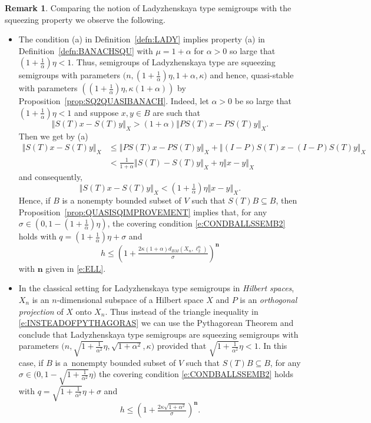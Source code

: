 \documentclass[a4paper,12pt,reqno]{amsart}
\theoremstyle{plain}
\theoremstyle{definition}
\newtheorem{rem}[lem]{Remark}
\numberwithin{equation}{section}
\newcommand{\norm}[1]{\left\Vert#1\right\Vert}
\renewcommand{\leq}{\leqslant}
\begin{document}
\begin{rem}
Comparing the notion of Ladyzhenskaya type semigroups with the squeezing property we observe the following. 
\begin{itemize}
\item[(i)] 
The condition (a) in Definition~\ref{defn:LADY} implies property (a) in Definition~\ref{defn:BANACHSQU} with $\mu=1+\alpha$ for $\alpha>0$ so large that $(1+\frac{1}{\alpha})\eta<1$. Thus, semigroups of Ladyzhenskaya type are squeezing semigroups with parameters $\Big(n, (1+\frac{1}{\alpha})\eta, 1+\alpha, \kappa\Big)$
and hence, quasi-stable with parameters $((1+\frac{1}{\alpha})\eta,\kappa(1+\alpha))$ by Proposition~\ref{prop:SQ2QUASIBANACH}. Indeed, let $\alpha>0$ be so large that $(1+\frac{1}{\alpha})\eta<1$ and suppose $x,y\in B$ are such that
$$\norm{S(T)x-S(T)y}_{X}>(1+\alpha)\norm{PS(T)x-PS(T)y}_{X}.$$
Then we get by (a)
\begin{equation}\label{e:INSTEADOFPYTHAGORAS}
\begin{split}
\norm{S(T)x-S(T)y}_{X}&\leq\norm{PS(T)x-PS(T)y}_{X}+\norm{(I-P)S(T)x-(I-P)S(T)y}_{X}\\
&<\tfrac{1}{1+\alpha}\norm{S(T)-S(T)y}_{X}+\eta\norm{x-y}_{X}
\end{split}
\end{equation}
and consequently,
$$\norm{S(T)x-S(T)y}_{X}<\left(1+\tfrac{1}{\alpha}\right)\eta\norm{x-y}_{X}.$$
Hence, if $B$ is a nonempty bounded subset of $V$ such that $S(T)B\subseteq B$, then Proposition~\ref{prop:QUASISQIMPROVEMENT} implies that, for any $\sigma\in(0,1-(1+\frac{1}{\alpha})\eta)$, the covering condition \eqref{e:CONDBALLSSEMB2} holds  with $q=(1+\frac{1}{\alpha})\eta+\sigma$ and 
$$h\leq\left(1+\tfrac{2\kappa(1+\alpha)d_{BM}(X_n,\ell^n_2)}{\sigma}\right)^{\mathbf{n}}$$
with $\mathbf{n}$ given in \eqref{e:ELL}. 

\item[(ii)] In the classical setting for Ladyzhenskaya type semigroups in \emph{Hilbert spaces}, $X_n$ is an $n$-dimensional subspace of a Hilbert space $X$ and $P$ is an \emph{orthogonal projection} of $X$ onto $X_n$. Thus instead of the triangle inequality in \eqref{e:INSTEADOFPYTHAGORAS} we can use the Pythagorean Theorem and conclude that Ladyzhenskaya type semigroups are squeezing semigroups with parameters $\Big(n, \sqrt{1+\frac{1}{\alpha^2}}\eta, \sqrt{1+\alpha^2}, \kappa\Big)$ provided that $\sqrt{1+\frac{1}{\alpha^2}}\eta<1$.
In this case, if $B$ is a~nonempty bounded subset of $V$ such that $S(T)B\subseteq B$, for any $\sigma\in\Big(0,1-\sqrt{1+\frac{1}{\alpha^2}}\eta\Big)$ the covering condition \eqref{e:CONDBALLSSEMB2} holds  with $q=\sqrt{1+\frac{1}{\alpha^2}}\eta+\sigma$ and 
$$h\leq\left(1+\tfrac{2\kappa\sqrt{1+\alpha^2}}{\sigma}\right)^{\mathbf{n}}.$$


\end{itemize}
\end{rem}
\end{document}
